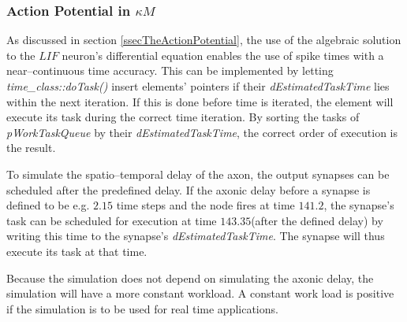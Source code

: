 		
		



		\subsubsection{Action Potential in $\kappa M$}

		As discussed in section \ref{ssecTheActionPotential}, the use of the algebraic solution to the $LIF$ neuron's differential equation enables the use of spike times with a near--continuous time accuracy.
		This can be implemented by letting \emph{time\_class::doTask()} insert elements' pointers if their \emph{dEstimatedTaskTime} lies within the next iteration.
		If this is done before time is iterated, the element will execute its task during the correct time iteration.
		By sorting the tasks of \emph{pWorkTaskQueue} by their \emph{dEstimatedTaskTime}, the correct order of execution is the result.

		To simulate the spatio--temporal delay of the axon, the output synapses can be scheduled after the predefined delay.
		If the axonic delay before a synapse is defined to be e.g. $2.15$ time steps and the node fires at time $141.2$, the synapse's task can be scheduled for execution at time $143.35$(after the defined delay) by writing this time to the synapse's \emph{dEstimatedTaskTime}.
		The synapse will thus execute its task at that time.

		Because the simulation does not depend on simulating the axonic delay, the simulation will have a more constant workload.
		A constant work load is positive if the simulation is to be used for real time applications.
		
		


